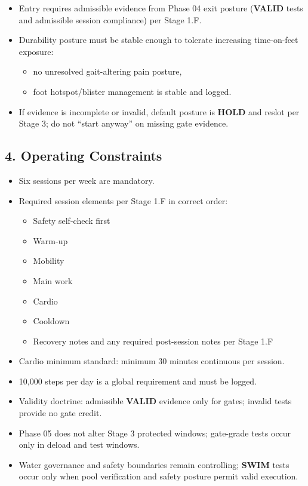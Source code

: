 \documentclass[10pt]{article}
\begin{document}
\begin{itemize}
\item Entry requires admissible evidence from Phase 04 exit posture (\textbf{VALID} tests and admissible session compliance) per Stage 1.F.
\item Durability posture must be stable enough to tolerate increasing time-on-feet exposure:
\begin{itemize}
\item no unresolved gait-altering pain posture,
\item foot hotspot/blister management is stable and logged.
\end{itemize}
\item If evidence is incomplete or invalid, default posture is \textbf{HOLD} and reslot per Stage 3; do not “start anyway” on missing gate evidence.
\end{itemize}

\subsection*{4. Operating Constraints}

\begin{itemize}
\item Six sessions per week are mandatory.
\item Required session elements per Stage 1.F in correct order:
\begin{itemize}
\item Safety self-check first
\item Warm-up
\item Mobility
\item Main work
\item Cardio
\item Cooldown
\item Recovery notes and any required post-session notes per Stage 1.F
\end{itemize}
\item Cardio minimum standard: minimum 30 minutes continuous per session.
\item 10,000 steps per day is a global requirement and must be logged.
\item Validity doctrine: admissible \textbf{VALID} evidence only for gates; invalid tests provide no gate credit.
\item Phase 05 does not alter Stage 3 protected windows; gate-grade tests occur only in deload and test windows.
\item Water governance and safety boundaries remain controlling; \textbf{SWIM} tests occur only when pool verification and safety posture permit valid execution.
\end{itemize}
\end{document}
